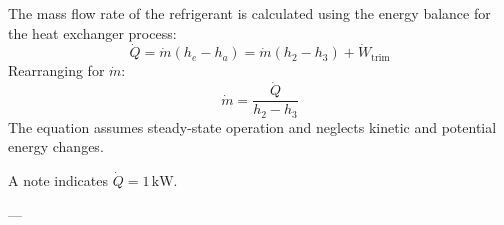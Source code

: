 The mass flow rate of the refrigerant is calculated using the energy balance for the heat exchanger process:  
\[
\dot{Q} = \dot{m} \left( h_e - h_a \right) = \dot{m} \left( h_2 - h_3 \right) + \dot{W}_{\text{trim}}
\]  
Rearranging for \( \dot{m} \):  
\[
\dot{m} = \frac{\dot{Q}}{h_2 - h_3}
\]  
The equation assumes steady-state operation and neglects kinetic and potential energy changes.  

A note indicates \( \dot{Q} = 1 \, \text{kW} \).

---
